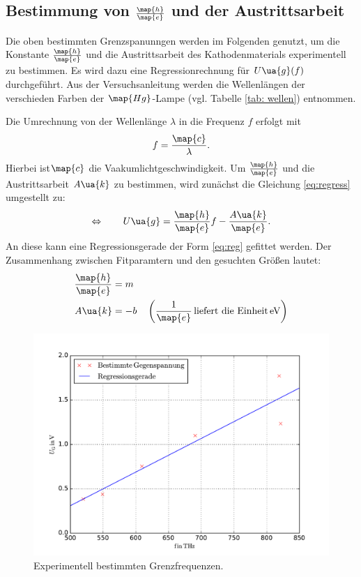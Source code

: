 \subsection{Bestimmung von $\frac{\map{h}}{\map{e}}$ und der Austrittsarbeit}

Die oben bestimmten Grenzspanunngen werden im %
Folgenden genutzt, um die Konstante $\frac{\map{h}}{\map{e}}$ und die Austrittsarbeit des Kathodenmaterials
experimentell zu bestimmen.
Es wird dazu eine Regressionrechnung für $U\ua{g}(f)$ durchgeführt.
Aus der Versuchsanleitung\cite{anleitung500} werden die Wellenlängen der verschieden Farben der $\map{Hg}$-Lampe (vgl. Tabelle \ref{tab: wellen})
entnommen.

Die Umrechnung von der Wellenlänge $\lambda$ in die Frequenz $f$ erfolgt mit
\begin{equation*}
  \label{eq:umrech}
  f=\frac{\map{c}}{\lambda}.
\end{equation*}
Hierbei ist$\map{c}$ die Vaakumlichtgeschwindigkeit\cite{scipy}. %
Um $\frac{\map{h}}{\map{e}}$ und die Austrittsarbeit $A\ua{k}$ zu bestimmen, wird zunächst die
Gleichung \eqref{eq:regress} umgestellt zu:
\begin{equation*}
  \Leftrightarrow \qquad U\ua{g}=\frac{\map{h}}{\map{e}} f - \frac{A\ua{k}}{\map{e}}.
\end{equation*}
An diese kann eine Regressionsgerade der Form \eqref{eq:reg} gefittet werden.
Der Zusammenhang zwischen Fitparamtern und den gesuchten Größen lautet:
\begin{align*}
  \frac{\map{h}}{\map{e}}&=m\\
  A\ua{k}&=-b \quad \left(\frac{1}{\map{e}}\,\text{liefert die Einheit} \, \si{\eV}\right)
\end{align*}
\begin{figure}
    \centering
    \includegraphics[width=1 \textwidth]{../Messdaten/wellenlaenge_gegen.pdf}
    \caption{Experimentell bestimmten Grenzfrequenzen.}
    \label{fig:grenz}
  \end{figure}

